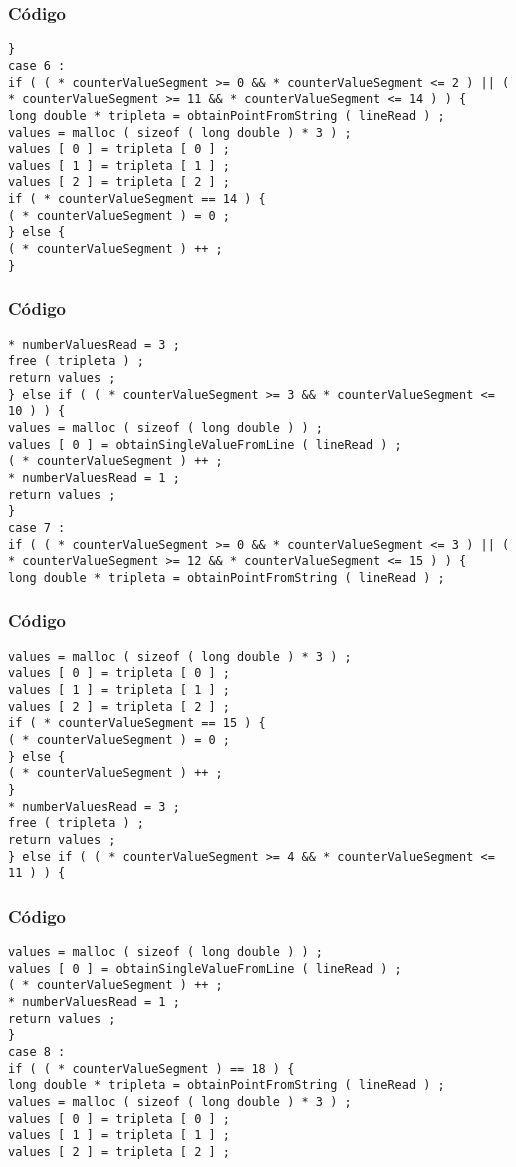 \documentclass{beamer}
\begin{document}
\begin{frame}[fragile]
\frametitle{C\'odigo}
\begin{verbatim}
} 
case 6 : 
if ( ( * counterValueSegment >= 0 && * counterValueSegment <= 2 ) || ( * counterValueSegment >= 11 && * counterValueSegment <= 14 ) ) { 
long double * tripleta = obtainPointFromString ( lineRead ) ; 
values = malloc ( sizeof ( long double ) * 3 ) ; 
values [ 0 ] = tripleta [ 0 ] ; 
values [ 1 ] = tripleta [ 1 ] ; 
values [ 2 ] = tripleta [ 2 ] ; 
if ( * counterValueSegment == 14 ) { 
( * counterValueSegment ) = 0 ; 
} else { 
( * counterValueSegment ) ++ ; 
} 
\end{verbatim}
\end{frame}
\begin{frame}[fragile]
\frametitle{C\'odigo}
\begin{verbatim}
* numberValuesRead = 3 ; 
free ( tripleta ) ; 
return values ; 
} else if ( ( * counterValueSegment >= 3 && * counterValueSegment <= 10 ) ) { 
values = malloc ( sizeof ( long double ) ) ; 
values [ 0 ] = obtainSingleValueFromLine ( lineRead ) ; 
( * counterValueSegment ) ++ ; 
* numberValuesRead = 1 ; 
return values ; 
} 
case 7 : 
if ( ( * counterValueSegment >= 0 && * counterValueSegment <= 3 ) || ( * counterValueSegment >= 12 && * counterValueSegment <= 15 ) ) { 
long double * tripleta = obtainPointFromString ( lineRead ) ; 
\end{verbatim}
\end{frame}
\begin{frame}[fragile]
\frametitle{C\'odigo}
\begin{verbatim}
values = malloc ( sizeof ( long double ) * 3 ) ; 
values [ 0 ] = tripleta [ 0 ] ; 
values [ 1 ] = tripleta [ 1 ] ; 
values [ 2 ] = tripleta [ 2 ] ; 
if ( * counterValueSegment == 15 ) { 
( * counterValueSegment ) = 0 ; 
} else { 
( * counterValueSegment ) ++ ; 
} 
* numberValuesRead = 3 ; 
free ( tripleta ) ; 
return values ; 
} else if ( ( * counterValueSegment >= 4 && * counterValueSegment <= 11 ) ) { 
\end{verbatim}
\end{frame}
\begin{frame}[fragile]
\frametitle{C\'odigo}
\begin{verbatim}
values = malloc ( sizeof ( long double ) ) ; 
values [ 0 ] = obtainSingleValueFromLine ( lineRead ) ; 
( * counterValueSegment ) ++ ; 
* numberValuesRead = 1 ; 
return values ; 
} 
case 8 : 
if ( ( * counterValueSegment ) == 18 ) { 
long double * tripleta = obtainPointFromString ( lineRead ) ; 
values = malloc ( sizeof ( long double ) * 3 ) ; 
values [ 0 ] = tripleta [ 0 ] ; 
values [ 1 ] = tripleta [ 1 ] ; 
values [ 2 ] = tripleta [ 2 ] ; 
\end{verbatim}
\end{frame}
\end{document}
